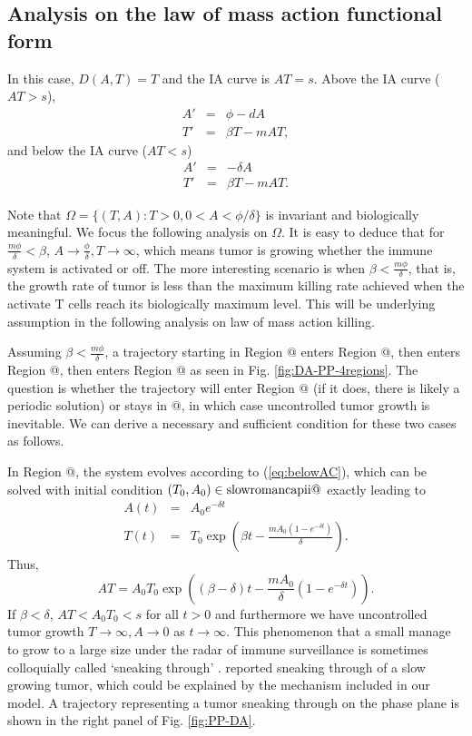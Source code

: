\documentclass[review,authoryear]{elsarticle}
\makeatletter
\newcommand*{\rom}[1]{\expandafter\@slowromancap\romannumeral #1@}
\makeatother
\begin{document}
\subsection{Analysis on the law of mass action functional form}

In this case, $D(A,T)=T$ and the IA curve is $AT=s$. Above the IA
curve ($AT>s$),
\begin{eqnarray*}
A' & = & \phi-dA\\
T' & = & \beta T-mAT,
\end{eqnarray*}
and below the IA curve ($AT<s$)
\begin{subequations}
\begin{eqnarray}
A' & = & -\delta A\\
T' & = & \beta T-mAT.
\end{eqnarray}
\label{eq:belowAC}
\end{subequations}

Note that $\Omega=\{(T,A):T>0,0<A<\phi/\delta\}$ is invariant and biologically
meaningful. We focus the following analysis on $\Omega$. It is easy to deduce that
for $\frac{m\phi}{\delta}<\beta$, $A\to\frac{\phi}{\delta},T\to\infty$,
which means tumor is growing whether the immune system is activated
or off. The more interesting scenario is when $\beta<\frac{m\phi}{\delta}$,
that is, the growth rate of tumor is less than the maximum killing
rate achieved when the activate T cells reach its biologically maximum
level. This will be underlying assumption in the following analysis on law of mass action killing. 

Assuming $\beta<\frac{m\phi}{\delta}$, a trajectory starting in Region \rom{3}
enters Region \rom{4}, then enters Region \rom{1}, then enters Region \rom{2} as seen in Fig. \ref{fig:DA-PP-4regions}.
The question is whether the trajectory will enter Region \rom{3} (if it does,
there is likely a periodic solution) or stays in \rom{2}, in which case uncontrolled tumor growth is inevitable. We can derive a necessary and sufficient condition for these two cases
as follows.

In Region \rom{2}, the system evolves according to (\ref{eq:belowAC}), which
can be solved with initial condition $(T_{0},A_{0})\in\text{\rom{2}}$
exactly leading to 
\begin{eqnarray}
A(t) & = & A_{0}e^{-\delta t}\nonumber \\
T(t) & = & T_{0}\exp(\beta t-\frac{mA_{0}(1-e^{-\delta t})}{\delta})\label{eq:soln belowAC}.
\end{eqnarray}
Thus,
\begin{equation}
AT=A_{0}T_{0}\exp((\beta-\delta)t-\frac{mA_{0}}{\delta}(1-e^{-\delta t})).
\end{equation} 
If $\beta<\delta$, $AT<A_{0}T_{0}<s$ for all $t>0$ and furthermore
we have uncontrolled tumor growth $T\to\infty,A\to0$ as $t\to\infty$. This phenomenon that a small manage to grow to a large size under the radar of immune surveillance is sometimes colloquially called `sneaking through' \citep{KUZNETSOV1994}.  \cite{George2018} reported sneaking through of a slow growing tumor, which could be explained by the mechanism included in our
model. A trajectory representing a tumor sneaking through on the phase
plane is shown in the right panel of Fig. \ref{fig:PP-DA}. 
\end{document}
